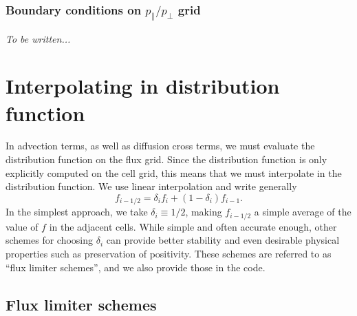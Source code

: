 \documentclass{notes}
\begin{document}
    \subsubsection{Boundary conditions on $p_\parallel / p_\perp$ grid}
    \emph{To be written...}

    \section{Interpolating in distribution function}\label{sec:interp}
    In advection terms, as well as diffusion cross terms, we must evaluate the
    distribution function on the flux grid. Since the distribution function is
    only explicitly computed on the cell grid, this means that we must
    interpolate in the distribution function. We use linear interpolation and
    write generally
    \begin{equation}
        f_{i-1/2} = \delta_{i} f_i + \left( 1 - \delta_i \right) f_{i-1}.
    \end{equation}
    In the simplest approach, we take $\delta_i\equiv 1/2$, making $f_{i-1/2}$
    a simple average of the value of $f$ in the adjacent cells. While simple and
    often accurate enough, other schemes for choosing $\delta_i$ can provide
    better stability and even desirable physical properties such as preservation
    of positivity. These schemes are referred to as ``flux limiter schemes'',
    and we also provide those in the code.

    \subsection{Flux limiter schemes}
\end{document}
